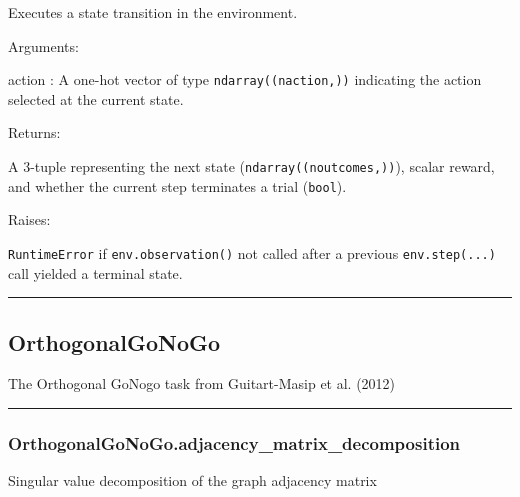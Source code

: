 Executes a state transition in the environment.

Arguments:

action : A one-hot vector of type \texttt{ndarray((naction,))}
indicating the action selected at the current state.

Returns:

A 3-tuple representing the next state (\texttt{ndarray((noutcomes,))}),
scalar reward, and whether the current step terminates a trial
(\texttt{bool}).

Raises:

\texttt{RuntimeError} if \texttt{env.observation()} not called after a
previous \texttt{env.step(...)} call yielded a terminal state.

\begin{center}\rule{0.5\linewidth}{\linethickness}\end{center}

\hypertarget{orthogonalgonogo}{%
\subsection{OrthogonalGoNoGo}\label{orthogonalgonogo}}

\begin{Shaded}
\begin{Highlighting}[]
\end{Highlighting}
\end{Shaded}

The Orthogonal GoNogo task from Guitart-Masip et al. (2012)

\begin{center}\rule{0.5\linewidth}{\linethickness}\end{center}

\hypertarget{orthogonalgonogo.adjacency_matrix_decomposition}{%
\subsubsection{OrthogonalGoNoGo.adjacency\_matrix\_decomposition}\label{orthogonalgonogo.adjacency_matrix_decomposition}}

\begin{Shaded}
\begin{Highlighting}[]
\NormalTok{)}
\end{Highlighting}
\end{Shaded}

Singular value decomposition of the graph adjacency matrix

